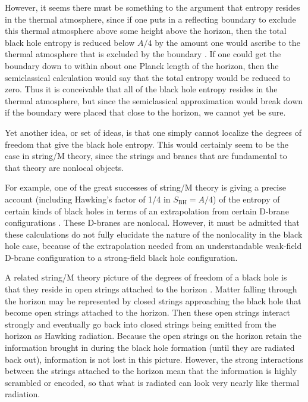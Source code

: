 \documentclass[12pt]{article} \usepackage{latexsym} \textwidth 15cm
\begin{document}
However, it seems there must be something to the argument that entropy
resides in the thermal atmosphere, since if one puts in a reflecting
boundary to exclude this thermal atmosphere above some height above
the horizon, then the total black hole entropy is reduced below $A/4$
by the amount one would ascribe to the thermal atmosphere that is
excluded by the boundary \cite{PageA4}.  If one could get the boundary
down to within about one Planck length of the horizon, then the
semiclassical calculation would say that the total entropy would be
reduced to zero.  Thus it is conceivable that all of the black hole
entropy resides in the thermal atmosphere, but since the semiclassical
approximation would break down if the boundary were placed that close
to the horizon, we cannot yet be sure.

Yet another idea, or set of ideas, is that one simply cannot localize
the degrees of freedom that give the black hole entropy.  This would
certainly seem to be the case in string/M theory, since the strings
and branes that are fundamental to that theory are nonlocal objects.

For example, one of the great successes of string/M theory is giving a
precise account (including Hawking's factor of 1/4 in $S_{\mathrm{BH}}
= A/4$) of the entropy of certain kinds of black holes in terms of an
extrapolation from certain D-brane configurations
\cite{Sen,SV,CM,HS,BMPV,JKM,MSt,BLMPSV,HMS,DVV,HLM,MSuss,KT,HRS,CT,
Mald,MStrom,HM,PolTASI,HP,MalStr,Vafa,Mald2,BFKS,MSW,SS,MAdSCFT,
Strom,Peet,BSS,Witten,GKS,Sen98,Cvetic98,Witten98,Skenderis99,
Gubser98,AGMOO,Marolf98,Horowitz99,Damour99,Khuri0,Peet0,DM,
Myers1,Khuri1,Mathur4,Thorlacius4,Duff4}.  These D-branes are
nonlocal.  However, it must be admitted that these calculations do not
fully elucidate the nature of the nonlocality in the black hole case,
because of the extrapolation needed from an understandable weak-field
D-brane configuration to a strong-field black hole configuration.

A related string/M theory picture of the degrees of freedom of a black
hole is that they reside in open strings attached to the horizon
\cite{Susskind}.  Matter falling through the horizon may be
represented by closed strings approaching the black hole that become
open strings attached to the horizon.  Then these open strings
interact strongly and eventually go back into closed strings being
emitted from the horizon as Hawking radiation.  Because the open
strings on the horizon retain the information brought in during the
black hole formation (until they are radiated back out), information
is not lost in this picture.  However, the strong interactions between
the strings attached to the horizon mean that the information is
highly scrambled or encoded, so that what is radiated can look very
nearly like thermal radiation.
\end{document}
